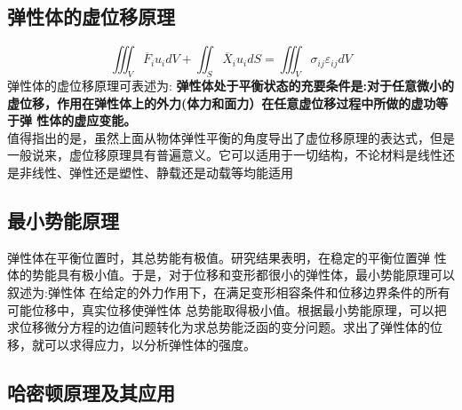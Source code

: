 \documentclass{article}
\begin{document}
\subsection{弹性体的虚位移原理}
\begin{equation}
 \iiint_V \overline{F}_i u_i dV + \iint_S \overline{X}_i u_i dS = \iiint_V \sigma_{ij} \varepsilon_{ij} dV
\end{equation}
弹性体的虚位移原理可表述为:
\textbf{弹性体处于平衡状态的充要条件是:对于任意微小的虚位移，作用在弹性体上的外力(体力和面力）在任意虚位移过程中所做的虚功等于弹
性体的虚应变能。}
\\
值得指出的是，虽然上面从物体弹性平衡的角度导出了虚位移原理的表达式，但是一般说来，虚位移原理具有普遍意义。它可以适用于一切结构，不论材料是线性还是非线性、弹性还是塑性、静载还是动载等均能适用

\subsection{最小势能原理}
弹性体在平衡位置时，其总势能有极值。研究结果表明，在稳定的平衡位置弹 性体的势能具有极小值。于是，对于位移和变形都很小的弹性体，最小势能原理可以叙述为:弹性体 在给定的外力作用下，在满足变形相容条件和位移边界条件的所有可能位移中，真实位移使弹性体 总势能取得极小值。根据最小势能原理，可以把求位移微分方程的边值问题转化为求总势能泛函的变分问题。求出了弹性体的位移，就可以求得应力，以分析弹性体的强度。

\subsection{哈密顿原理及其应用}
\end{document}
